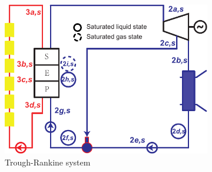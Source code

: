 \noindent \begin{figure}[htbp]
\centering
	\begin{subfigure}[b]{0.64\columnwidth}
	\includegraphics[width = \columnwidth]{fig/Trough-s}
	\caption{Trough-Rankine system}\label{fig:TroughRankine}
	\end{subfigure}
	~
\begin{subfigure}[b]{0.26\columnwidth}

\end{subfigure}
\end{figure}
